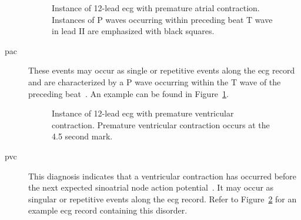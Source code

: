 \documentclass[\main/thesis.tex]{subfiles}
\begin{document}
\begin{description}
    \begin{figure}[ht]
        \centering
        \caption{Instance of 12-lead \gls{ecg} with premature atrial contraction. Instances of P waves occurring within preceding beat T wave in lead II are emphasized with black squares.}
        \label{fig:full_PAC}
    \end{figure}
    \item[\gls{pac}] These events may occur as single or repetitive events along the \gls{ecg} record and are characterized by a P wave occurring within the T wave of the preceding beat~\cite{ecg-utah-lesson}.
    An example can be found in Figure~\ref{fig:full_PAC}.
 
    \begin{figure}[ht]
        \centering
        \caption{Instance of 12-lead \gls{ecg} with premature ventricular contraction. Premature ventricular contraction occurs at the 4.5 second mark.}
        \label{fig:full_PVC}
    \end{figure}
    \item[\gls{pvc}] This diagnosis indicates that a ventricular contraction has occurred before the next expected sinoatrial node action potential~\cite{surawicz_borys_ahaaccfhrs_2009}. It may occur as singular or repetitive events along the \gls{ecg} record.
    Refer to Figure~\ref{fig:full_PVC} for an example \gls{ecg} record containing this disorder.


\end{description}
\end{document}
